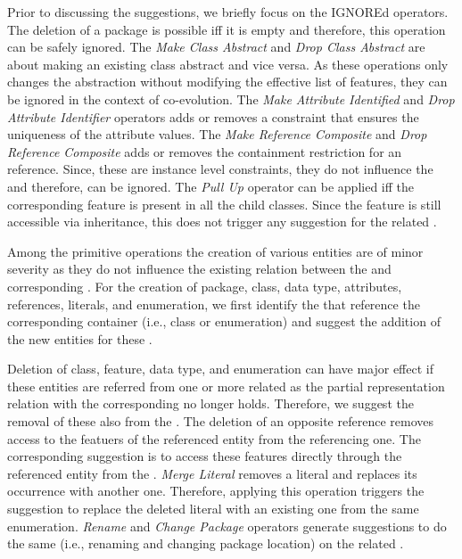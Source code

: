 Prior to discussing the suggestions, we briefly focus on the \textsf{IGNORE}d operators. The deletion of a package is possible iff it is empty and therefore, this operation can be safely ignored. The \textit{Make Class Abstract} and \textit{Drop Class Abstract} are about making an existing class abstract and vice versa. As these operations only changes the abstraction without modifying the effective list of features, they can be ignored in the context of \viewtype co-evolution. The \textit{Make Attribute Identified} and \textit{Drop Attribute Identifier} operators adds or removes a constraint that ensures the uniqueness of the attribute values. The \textit{Make Reference Composite} and \textit{Drop Reference Composite} adds or removes the containment restriction for an reference. Since, these are instance level constraints, they do not influence the \viewtype and therefore, can be ignored. The \textit{Pull Up} operator can be applied iff the corresponding feature is present in all the child classes. Since the feature is still accessible via inheritance, this does not trigger any suggestion for the related \viewtypes.

Among the primitive operations the creation of various entities are of minor severity as they do not influence the existing relation between the \metamodel and corresponding \viewtypes. For the creation of package, class, data type, attributes, references, literals, and enumeration, we first identify the \viewtypes that reference the corresponding container (i.e., class or enumeration) and suggest the addition of the new entities for these \viewtypes.

Deletion of class, feature, data type, and enumeration can have major effect if these entities are referred from one or more related \viewtypes as the partial representation relation with the corresponding \metamodel no longer holds. Therefore, we suggest the removal of these also from the \viewtypes. The deletion of an opposite reference removes access to the featuers of the referenced entity from the referencing one. The corresponding suggestion is to access these features directly through the referenced entity from the \viewtype. \textit{Merge Literal} removes a literal and replaces its occurrence with another one. Therefore, applying this operation triggers the suggestion to replace the deleted literal with an existing one from the same enumeration. \textit{Rename} and \textit{Change Package} operators generate suggestions to do the same (i.e., renaming and changing package location) on the related \viewtypes.


